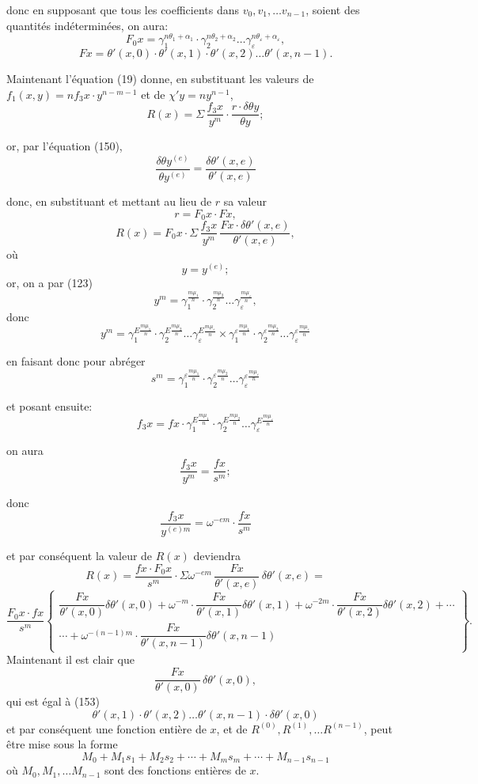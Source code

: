 \documentclass{article}
\begin{document}
donc en supposant que tous les coefficients dans $v_0, v_1, \ldots v_{n-1}$, soient des quantités indéterminées, on aura:
\[ F_0 x = \gamma_1^{n\theta_1+\alpha_1} \cdot \gamma_2^{n\theta_2+\alpha_2} \ldots \gamma_\varepsilon^{n\theta_\varepsilon+\alpha_\varepsilon}, \tag{153} \]
\[ F x = \theta'(x, 0) \cdot \theta'(x, 1) \cdot \theta'(x, 2) \ldots \theta'(x, n-1). \]

Maintenant l'équation (19) donne, en substituant les valeurs de $f_1(x, y) = n f_3 x \cdot y^{n-m-1}$ et de $\chi' y = n y^{n-1}$,
\[ R(x) = \Sigma\,\frac{f_3 x}{y^{m}} \cdot \frac{r \cdot \delta\theta y}{\theta y}; \]

or, par l'équation (150),
\[ \frac{\delta\theta y^{(e)}}{\theta y^{(e)}} = \frac{\delta\theta'(x, e)}{\theta'(x, e)} \]

donc, en substituant et mettant au lieu de $r$ sa valeur
\[ r = F_0 x \cdot F x, \]
\[ R(x) = F_0 x \cdot \Sigma\,\frac{f_3 x}{y^{m}}\,\frac{F x \cdot \delta\theta'(x,e)}{\theta'(x,e)}, \tag{154} \]
où
\[ y = y^{(e)}; \]
or, on a par (123)
\[ y^{m} = \gamma_1^{\frac{m\mu_1}{n}} \cdot \gamma_2^{\frac{m\mu_2}{n}} \ldots \gamma_\varepsilon^{\frac{m\mu_\varepsilon}{n}}, \]
donc
\[ y^{m} = \gamma_1^{E\frac{m\mu_1}{n}} \cdot \gamma_2^{E\frac{m\mu_2}{n}} \ldots \gamma_\varepsilon^{E\frac{m\mu_\varepsilon}{n}} \times \gamma_1^{\varepsilon\frac{m\mu_1}{n}} \cdot \gamma_2^{\varepsilon\frac{m\mu_2}{n}} \ldots \gamma_\varepsilon^{\varepsilon\frac{m\mu_\varepsilon}{n}} \tag{155} \]

en faisant donc pour abréger
\[ s^{m} = \gamma_1^{\varepsilon\frac{m\mu_1}{n}} \cdot \gamma_2^{\varepsilon\frac{m\mu_2}{n}} \ldots \gamma_\varepsilon^{\varepsilon\frac{m\mu_\varepsilon}{n}} \tag{156} \]

et posant ensuite:
\[ f_3 x = f x \cdot \gamma_1^{E\frac{m\mu_1}{n}} \cdot \gamma_2^{E\frac{m\mu_2}{n}} \ldots \gamma_\varepsilon^{E\frac{m\mu_\varepsilon}{n}} \tag{157} \]

on aura
\[ \frac{f_3 x}{y^{m}} = \frac{f x}{s^{m}}; \]

donc
\[ \frac{f_3 x}{y^{(e)m}} = \omega^{-em} \cdot \frac{f x}{s^{m}} \]

et par conséquent la valeur de $R(x)$ deviendra
\[ R(x) = \frac{f x \cdot F_0 x}{s^{m}} \cdot \Sigma\omega^{-em}\,\frac{F x}{\theta'(x,e)}\,\delta\theta'(x,e) = \tag{158} \]
\[ \frac{F_0 x \cdot f x}{s^{m}} \left\{ \begin{array}{l} \dfrac{F x}{\theta'(x,0)}\delta\theta'(x,0)+\omega^{-m} \cdot \dfrac{F x}{\theta'(x,1)}\delta\theta'(x,1)+\omega^{-2m} \cdot \dfrac{F x}{\theta'(x,2)}\delta\theta'(x,2)+\cdots \\ \cdots+\omega^{-(n-1)m} \cdot \dfrac{F x}{\theta'(x,n-1)}\delta\theta'(x,n-1) \end{array} \right\}. \]
Maintenant il est clair que
\[ \frac{F x}{\theta'(x,0)}\,\delta\theta'(x,0), \]
qui est égal à (153)
\[ \theta'(x,1) \cdot \theta'(x,2) \ldots \theta'(x,n-1) \cdot \delta\theta'(x,0) \]
et par conséquent une fonction entière de $x$, et de $R^{(0)}, R^{(1)}, \ldots R^{(n-1)}$, peut être mise sous la forme
\[ M_0 + M_1 s_1 + M_2 s_2 + \cdots + M_m s_m + \cdots + M_{n-1}s_{n-1} \]
où $M_0, M_1, \ldots M_{n-1}$ sont des fonctions entières de $x$.
\end{document}
